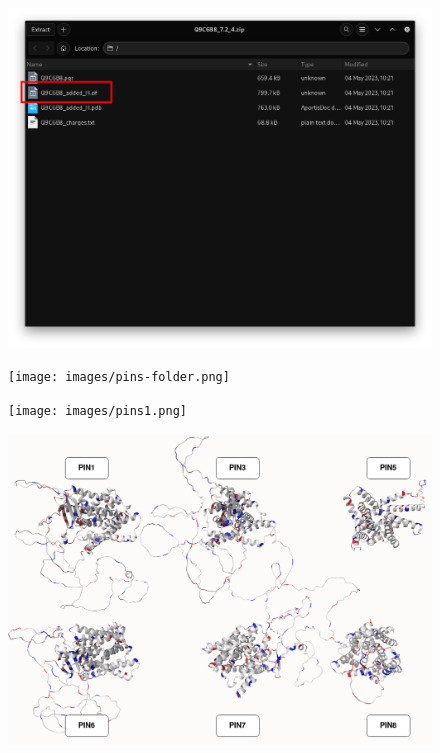 \documentclass[
]{beamer}
\begin{document}
\begin{frame}
  \begin{figure}
    \includegraphics[width=1\textwidth,height=\textheight,keepaspectratio]{images/folder.png}
  \end{figure}
\end{frame}

\begin{frame}
  \begin{figure}
    \texttt{[image: images/pins-folder.png]}
  \end{figure}
\end{frame}

\begin{frame}
  \begin{figure}
    \texttt{[image: images/pins1.png]}
  \end{figure}
\end{frame}

\begin{frame}
  \begin{figure}
    \includegraphics[width=1\textwidth,height=\textheight,keepaspectratio]{images/pins2.png}
  \end{figure}
\end{frame}
\end{document}

